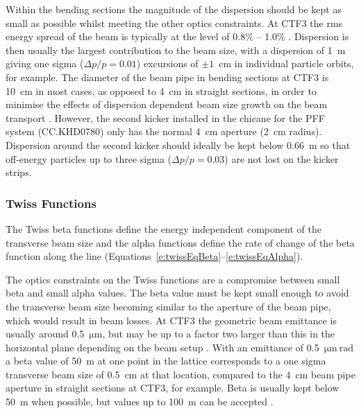 Within the bending sections the magnitude of the dispersion should be kept as small as possible whilst meeting the other optics constraints. At CTF3 the rms energy spread of the beam is typically at the  level of 0.8\% -- 1.0\% \cite{CTF3}. Dispersion is then usually the largest contribution to the beam size, with a dispersion of 1~m giving one sigma (\(\Delta p/p=0.01\)) excursions of \(\pm1\)~cm in individual particle orbits, for example. The diameter of the beam pipe in bending sections at CTF3 is 10~cm in most cases, as opposed to 4~cm in straight sections, in order to minimise the effects of dispersion dependent beam size growth on the beam transport \cite{CTF3}. However, the second kicker installed in the chicane for the PFF system (CC.KHD0780) only has the normal 4~cm aperture (2~cm radius).  Dispersion around the second kicker should ideally be kept below 0.66~m so that off-energy particles up to three sigma (\(\Delta p/p=0.03\)) are not lost on the kicker strips.

\subsubsection{Twiss Functions}


The Twiss beta functions define the energy independent component of the transverse beam size and the alpha functions define the rate of change of the beta function along the line (Equations~\ref{e:twissEqBeta}--\ref{e:twissEqAlpha}). %

The optics constraints on the Twiss functions are a compromise between small beta and small alpha values. The beta value must be kept small enough to avoid the transverse beam size becoming similar to the aperture of the beam pipe, which would result in beam losses. At CTF3 the geometric beam emittance is usually around 0.5~\(\mathrm{\mu m}\), but may be up to a factor two larger than this in the horizontal plane depending on the beam setup \cite{davideThesis}. With an emittance of 0.5~\(\mathrm{\mu m~rad}\) a beta value of 50~m at one point in the lattice corresponds to a one sigma transverse beam size of 0.5~cm at that location, compared to the 4~cm beam pipe aperture in straight sections at CTF3, for example. Beta is usually kept below 50~m when possible, but values up to 100~m can be accepted \cite{piotrPriv}. 

